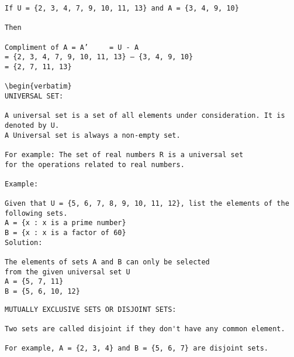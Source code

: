 \documentclass[a4paper,12pt]{article}
\begin{document}
\newpage
\begin{verbatim}
If U = {2, 3, 4, 7, 9, 10, 11, 13} and A = {3, 4, 9, 10}

Then

Compliment of A = A’	 = U - A
= {2, 3, 4, 7, 9, 10, 11, 13} – {3, 4, 9, 10}
= {2, 7, 11, 13}

\begin{verbatim}
UNIVERSAL SET: 

A universal set is a set of all elements under consideration. It is denoted by U. 
A Universal set is always a non-empty set.

For example: The set of real numbers R is a universal set
for the operations related to real numbers.

Example: 

Given that U = {5, 6, 7, 8, 9, 10, 11, 12}, list the elements of the following sets. 
A = {x : x is a prime number}
B = {x : x is a factor of 60}
Solution: 

The elements of sets A and B can only be selected 
from the given universal set U 
A = {5, 7, 11}
B = {5, 6, 10, 12}
\end{verbatim}

\newpage
\begin{verbatim}
MUTUALLY EXCLUSIVE SETS OR DISJOINT SETS: 

Two sets are called disjoint if they don't have any common element. 

For example, A = {2, 3, 4} and B = {5, 6, 7} are disjoint sets.

\end{verbatim}
\end{document}
